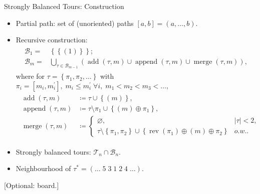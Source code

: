 \documentclass[
  size=8pt,
  style=klope,
  paper=screen,
  pauseslide,
  nopagebreaks,
  hlsections,
  fleqn
]{powerdot}
\def\board{{\color{green} [Optional: board.]}}
\def\eqitspace{\vspace{-5mm}}
\begin{document}
\begin{slide}[toc=]{Strongly Balanced Tours: Construction}
  \begin{itemize}
    \item
    Partial path: set of (unoriented) paths $\left[a,b\right] = \left(a,\ldots,b\right)$.
    \item
    Recursive construction:
    \begin{align}
      \begin{split}
      \mathcal{B}_1 = & \left\{ \left\{\left(1\right)\right\} \right\};
      \\
      \mathcal{B}_m = & \bigcup_{\tau \in \mathcal{B}_{m-1}}
        \left(
        \operatorname{add}\left(\tau,m\right)
        \cup
        \operatorname{append}\left(\tau,m\right)
        \cup
        \operatorname{merge}\left(\tau,m\right)
        \right),
      \end{split}
    \end{align}
    where for
        $ \tau = \left\{ \pi_1, \pi_2, \ldots \right\} $
        with
        $
        \pi_i = \left[m_i,m_i^\prime\right], \;
        m_i \leq m_i^\prime \; \forall i, \;
        m_1 < m_2 < m_3 < \ldots ,
        $
    \begin{align}
      \begin{split}
        \operatorname{add}\left(\tau,m\right) & \coloneqq \tau \cup \left\{ \left(m\right) \right\},
        \\
        \operatorname{append}\left(\tau,m\right) & \coloneqq \tau \setminus \pi_1 \cup \left\{ \left(m\right) \oplus \pi_1 \right\},
        \\
        \operatorname{merge}\left(\tau,m\right) & \coloneqq
        \begin{cases}
          \varnothing, & \lvert\tau\rvert < 2,
          \\
          \tau \setminus \left\{\pi_1,\pi_2\right\} \cup \left\{ \operatorname{rev}\left(\pi_1\right) \oplus \left(m\right) \oplus \pi_2 \right\} & o.w..
        \end{cases}
      \end{split}
    \end{align}
    \eqitspace%
  \item
    Strongly balanced tours: $\mathcal{T}_n \cap \mathcal{B}_n$.
  \item
    Neighbourhood of $\tau^\ast =
      \left( \ldots \; 5 \; 3 \; 1 \; 2 \; 4 \; \ldots \right).$
  \end{itemize}
  \board
\end{slide}
\end{document}
